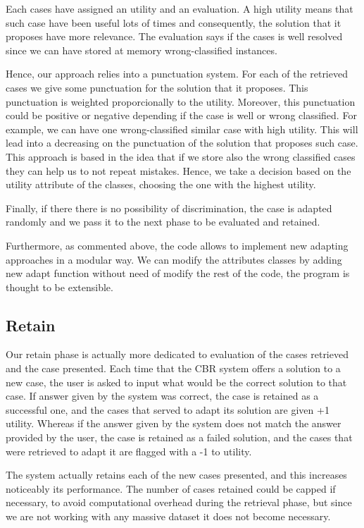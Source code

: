 \documentclass[11pt]{article}
\begin{document}
Each cases have assigned an utility and an evaluation. A high utility means that such case have been useful lots of times and consequently, the solution that it proposes have more relevance. The evaluation says if the cases is well resolved since we can have stored at memory wrong-classified instances.

Hence, our approach relies into a punctuation system. For each of the retrieved cases we give some punctuation for the solution that it proposes. This punctuation is weighted proporcionally to the utility. Moreover, this punctuation could be positive or negative depending if the case is well or wrong classified. For example, we can have one wrong-classified similar case with high utility. This will lead into a decreasing on the punctuation of the solution that proposes such case. This approach is based in the idea that if we store also the wrong classified cases they can help us to not repeat mistakes. Hence, we take a decision based on the utility attribute of the classes, choosing the one with the highest utility. 

Finally, if there there is no possibility of discrimination, the case is adapted randomly and we pass it to the next phase to be evaluated and retained.

Furthermore, as commented above, the code allows to implement new adapting approaches in a modular way. We can modify the attributes classes by adding new adapt function without need of modify the rest of the code, the program is thought to be extensible.

\subsection{Retain}
Our retain phase is actually more dedicated to evaluation of the cases retrieved and the case presented. Each time that the CBR system offers a solution to a new case, the user is asked to input what would be the correct solution to that case. If answer given by the system was correct, the case is retained as a successful one, and the cases that served to adapt its solution are given +1 utility. Whereas if the answer given by the system does not match the answer provided by the user, the case is retained as a failed solution, and the cases that were retrieved to adapt it are flagged with a -1 to utility.

The system actually retains each of the new cases presented, and this increases noticeably its performance. The number of cases retained could be capped if necessary, to avoid computational overhead during the retrieval phase, but since we are not working with any massive dataset it does not become necessary.
\end{document}
